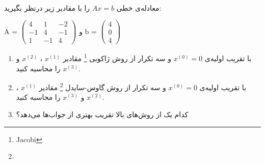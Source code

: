 \\
معادله‌ی خطی
$Ax = b$
را با مقادیر زیر درنظر بگیرید:
\begin{LTR}
\begin{center}
A = $\begin{pmatrix}
4 & 1 & -2\\
-1 & 4 & -1\\
1 & -1 & 4
\end{pmatrix}$ و
b =  $\begin{pmatrix}
4\\
0\\
4
\end{pmatrix}$
\end{center}
\end{LTR}

\begin{enumerate}
\item
با تقریب اولیه‌ی
$x^{(0)} = 0$
و سه تکرار از روش ژاکوبی
\footnote{Jacobi}
مقادیر
$x^{(1)}$
،
$x^{(2)}$
و
$x^{(3)}$
را محاسبه کنید.

\item
با تقریب اولیه‌ی
$x^{(0)} = 0$
و سه تکرار از روش گاوس-سایدل
\footnote{}
مقادیر
$x^{(1)}$
،
$x^{(2)}$
و
$x^{(3)}$
را محاسبه کنید.
\item
کدام یک از روش‌های بالا تقریب بهتری از جواب‌ها می‌دهد؟

\end{enumerate}

